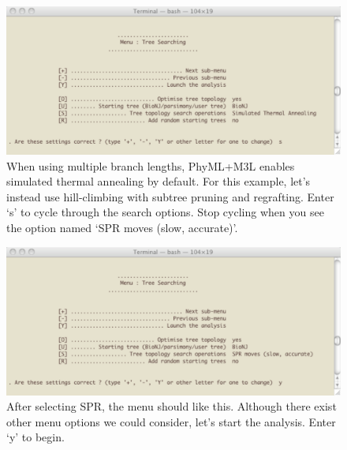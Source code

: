\documentclass[11pt]{article}
\begin{document}
\begin{figure}[p]
\centering
\includegraphics[width=5.5 in]{GRAPHICS/a11.pdf}
\caption{When using multiple branch lengths, PhyML+M3L enables simulated thermal annealing by default.  For this example, let's instead use hill-climbing with subtree pruning and regrafting.  Enter `s' to cycle through the search options.  Stop cycling when you see the option named `SPR moves (slow, accurate)'.}
\end{figure}
\clearpage

%

\begin{figure}[p]
\centering
\includegraphics[width=5.5 in]{GRAPHICS/a13.pdf}

\caption{After selecting SPR, the menu should like this.  Although there exist other menu options we could consider, let's start the analysis.  Enter `y' to begin.}
\end{figure}
\clearpage
\end{document}
